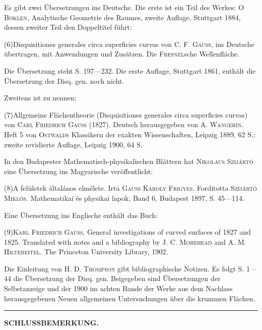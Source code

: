 Es gibt zwei Übersetzungen ins Deutsche. Die erste ist ein Teil des Werkes: \textsc{O Böklen}, Analytische
Geometrie des Raumes, zweite Auflage, Stuttgart 1884, dessen zweiter Teil den Doppeltitel führt:
\par\noindent (6)\quad Disquisitiones generales circa superficies curvas von \textsc{C. F. Gauss}, ins Deutsche übertragen, mit Anwendungen
und Zusätzen. Die \textsc{Fresnel}sche Wellenfläche.
\par
Die Übersetzung steht S. 197—232. Die erste Auflage, Stuttgart 1861, enthält die Übersetzung der
Disq. gen. noch nicht.
\par
Zweitens ist zu nennen:
\par\noindent (7)\quad Allgemeine Flächentheorie (Disquisitiones generales circa superficies curvas) von \textsc{Carl Friedrich
Gauss} (1827). Deutsch herausgegeben von \textsc{A. Wangerin}. Heft 5 von \textsc{Ostwalds} Klassikern der exakten
Wissenschaften, Leipzig 1889, 62 S.; zweite revidierte Auflage, Leipzig 1900, 64 S.
\par
In den Budapester Mathematisch-physikalischen Blättern hat \textsc{Nikolaus Szíjártó} eine Übersetzung
ins Magyarische veröffentlicht:
\par\noindent (8)\quad A felületek általános elmélete. Irta \textsc{Gauss Károly Frigyes}. Forditotta \textsc{Szíjártó Miklós}. Mathematikai
és physikai lapok, Band 6, Budapest 1897, S. 45—114.
\par
Eine Übersetzung ins Englische enthält das Buch:
\par\noindent (9)\quad \textsc{Karl Friedrich Gauss}, General investigations of curved surfaces of 1827 and 1825. Translated
with notes and a bibliography by \textsc{J. C. Morehead} and \textsc{A. M. Hiltebeitel}. The Princeton University
Library, 1902.
\par
Die Einleitung von \textsc{H. D. Thompson} gibt bibliographische Notizen. Es folgt S. 1—44 die Übersetzung
der Disq. gen. Beigegeben sind Übersetzungen der Selbstanzeige und der 1900 im achten Bande
der Werke aus dem Nachlass herausgegebenen Neuen allgemeinen Untersuchungen über die krummen
Flächen.
\par\bigskip\begin{center}\rule{.18\linewidth}{.3pt}\end{center}
\endgroup
\clearpage{}
\begin{center}\textbf{SCHLUSSBEMERKUNG.}\end{center}
\begingroup\small
